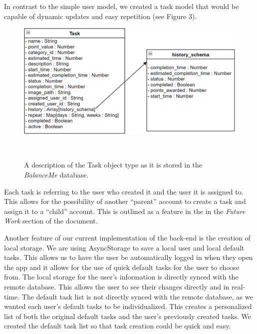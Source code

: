 \documentclass{sigchi}
\begin{document}
In contrast to the simple user model, we created a task model that would be
capable of dynamic updates and easy repetition (see Figure 3).

\begin{figure}
\centering
  \includegraphics[width=1.0\columnwidth]{figures/task}
  \caption{A description of the Task object type as it is stored in the
	\textit{BalanceMe} database. }~\label{fig:figure3}
\end{figure}

Each task is referring to the user who created it and the user it is assigned
to. This allows for the possibility of another ``parent'' account to create a
task and assign it to a ``child'' account. This is outlined as a feature in the
in the \textit{Future Work} section of the document.

Another feature of our current implementation of the back-end is the creation
of local storage. We are using AsyncStorage to save a local user and local
default tasks. This allows us to have the user be automatically logged in when
they open the app and it allows for the use of quick default tasks for the user
to choose from. The local storage for the user’s information is directly synced
with the remote database. This allows the user to see their changes directly
and in real-time. The default task list is not directly synced with the remote
database, as we wanted each user’s default tasks to be individualized. This
creates a personalized list of both the original default tasks and the user’s
previously created tasks. We created the default task list so that task
creation could be quick and easy.
\end{document}
